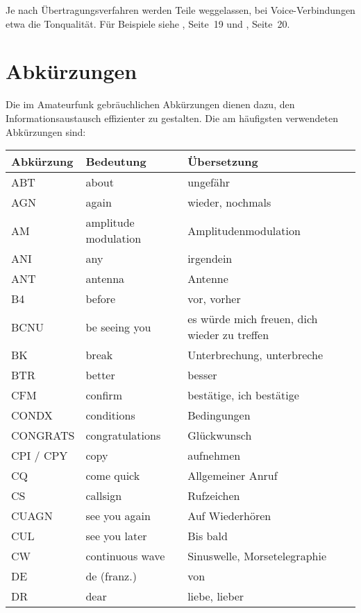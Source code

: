 Je nach Übertragungsverfahren werden Teile weggelassen, bei Voice-Verbindungen etwa die Tonqualität. Für Beispiele siehe , Seite 19 und , Seite 20.

\section{Abkürzungen}
Die im Amateurfunk gebräuchlichen Abkürzungen dienen dazu, den Informationsaustausch effizienter zu gestalten. Die am häufigsten verwendeten Abkürzungen sind:

{

\begin{longtabu} to \linewidth{lll}
\rowfont \bfseries Abkürzung & Bedeutung &  Übersetzung \\
\toprule
\endhead
{}
ABT & about & ungefähr \\ \midrule
AGN & again & wieder, nochmals \\ \midrule
AM & amplitude modulation & Amplitudenmodulation \\ \midrule
ANI & any & irgendein \\ \midrule
ANT & antenna & Antenne \\ \midrule
B4 & before & vor, vorher \\ \midrule
BCNU & be seeing you & es würde mich freuen, dich  wieder zu treffen \\ \midrule
BK & break & Unterbrechung, unterbreche \\ \midrule
BTR & better & besser \\ \midrule
CFM & confirm & bestätige, ich bestätige \\ \midrule
CONDX & conditions & Bedingungen \\ \midrule
CONGRATS & congratulations & Glückwunsch \\ \midrule
CPI / CPY & copy & aufnehmen \\ \midrule
CQ & come quick & Allgemeiner Anruf \\ \midrule
CS & callsign & Rufzeichen \\ \midrule
CUAGN & see you again & Auf Wiederhören \\ \midrule
CUL & see you later & Bis bald \\ \midrule
CW & continuous wave & Sinuswelle, Morsetelegraphie \\ \midrule
DE & de (franz.) & von \\ \midrule
DR & dear & liebe, lieber \\ \midrule

\end{longtabu}}
